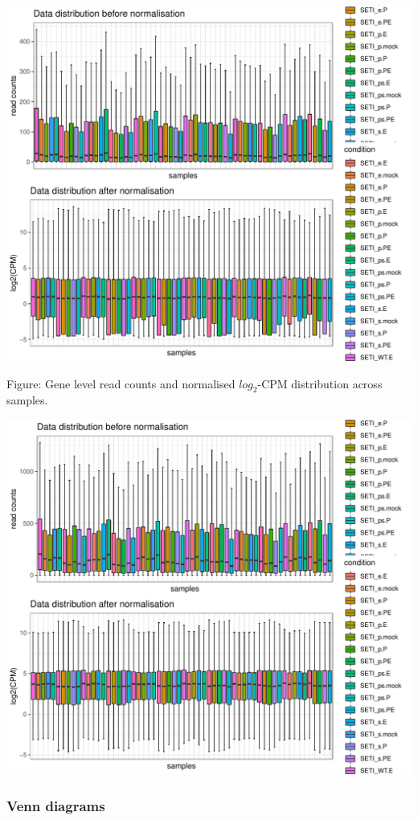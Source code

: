 \documentclass[]{article}
\begin{document}
\includegraphics[width=16.67in]{X2025.01.13.16.34.12.j145/figure/Transcript expression distribution}

Figure: Gene level read counts and normalised \(log_2\)-CPM distribution
across samples.

\includegraphics[width=16.67in]{X2025.01.13.16.34.12.j145/figure/Gene expression distribution}

\subsubsection{Venn diagrams}\label{venn-diagrams}
\end{document}
